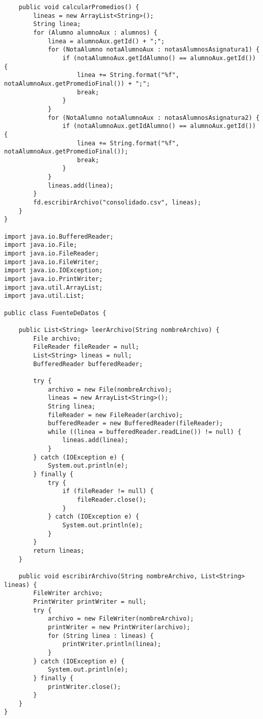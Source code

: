 \documentclass[10pt]{article}
\begin{document}
\begin{verbatim}
    public void calcularPromedios() {
        lineas = new ArrayList<String>();
        String linea;
        for (Alumno alumnoAux : alumnos) {
            linea = alumnoAux.getId() + ";";
            for (NotaAlumno notaAlumnoAux : notasAlumnosAsignatura1) {
                if (notaAlumnoAux.getIdAlumno() == alumnoAux.getId()) {
                    linea += String.format("%f", notaAlumnoAux.getPromedioFinal()) + ";";
                    break;
                }
            }
            for (NotaAlumno notaAlumnoAux : notasAlumnosAsignatura2) {
                if (notaAlumnoAux.getIdAlumno() == alumnoAux.getId()) {
                    linea += String.format("%f", notaAlumnoAux.getPromedioFinal());
                    break;
                }
            }
            lineas.add(linea);
        }
        fd.escribirArchivo("consolidado.csv", lineas);
    }
}

import java.io.BufferedReader;
import java.io.File;
import java.io.FileReader;
import java.io.FileWriter;
import java.io.IOException;
import java.io.PrintWriter;
import java.util.ArrayList;
import java.util.List;

public class FuenteDeDatos {

    public List<String> leerArchivo(String nombreArchivo) {
        File archivo;
        FileReader fileReader = null;
        List<String> lineas = null;
        BufferedReader bufferedReader;

        try {
            archivo = new File(nombreArchivo);
            lineas = new ArrayList<String>();
            String linea;
            fileReader = new FileReader(archivo);
            bufferedReader = new BufferedReader(fileReader);
            while ((linea = bufferedReader.readLine()) != null) {
                lineas.add(linea);
            }
        } catch (IOException e) {
            System.out.println(e);
        } finally {
            try {
                if (fileReader != null) {
                    fileReader.close();
                }
            } catch (IOException e) {
                System.out.println(e);
            }
        }
        return lineas;
    }

    public void escribirArchivo(String nombreArchivo, List<String> lineas) {
        FileWriter archivo;
        PrintWriter printWriter = null;
        try {
            archivo = new FileWriter(nombreArchivo);
            printWriter = new PrintWriter(archivo);
            for (String linea : lineas) {
                printWriter.println(linea);
            }
        } catch (IOException e) {
            System.out.println(e);
        } finally {
            printWriter.close();
        }
    }
}
\end{verbatim}
\end{document}

